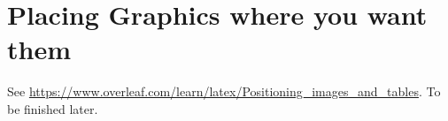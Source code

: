 \section{Placing Graphics where you want them}

See \url{https://www.overleaf.com/learn/latex/Positioning_images_and_tables}. To be finished later.